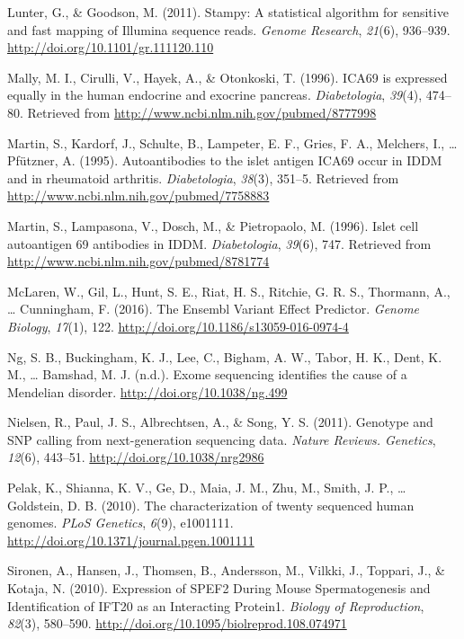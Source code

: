 \documentclass[12pt,twoside]{reedthesis}
\theoremstyle{definition}
\theoremstyle{definition}
\theoremstyle{remark}
\begin{document}
  \hypertarget{ref-Lunter2011}{}
  Lunter, G., \& Goodson, M. (2011). Stampy: A statistical algorithm for
  sensitive and fast mapping of Illumina sequence reads. \emph{Genome
  Research}, \emph{21}(6), 936--939.
  \url{http://doi.org/10.1101/gr.111120.110}
  
  \hypertarget{ref-Mally1996}{}
  Mally, M. I., Cirulli, V., Hayek, A., \& Otonkoski, T. (1996). ICA69 is
  expressed equally in the human endocrine and exocrine pancreas.
  \emph{Diabetologia}, \emph{39}(4), 474--80. Retrieved from
  \url{http://www.ncbi.nlm.nih.gov/pubmed/8777998}
  
  \hypertarget{ref-Martin1995}{}
  Martin, S., Kardorf, J., Schulte, B., Lampeter, E. F., Gries, F. A.,
  Melchers, I., \ldots{} Pfützner, A. (1995). Autoantibodies to the islet
  antigen ICA69 occur in IDDM and in rheumatoid arthritis.
  \emph{Diabetologia}, \emph{38}(3), 351--5. Retrieved from
  \url{http://www.ncbi.nlm.nih.gov/pubmed/7758883}
  
  \hypertarget{ref-Martin1996}{}
  Martin, S., Lampasona, V., Dosch, M., \& Pietropaolo, M. (1996). Islet
  cell autoantigen 69 antibodies in IDDM. \emph{Diabetologia},
  \emph{39}(6), 747. Retrieved from
  \url{http://www.ncbi.nlm.nih.gov/pubmed/8781774}
  
  \hypertarget{ref-McLaren2016}{}
  McLaren, W., Gil, L., Hunt, S. E., Riat, H. S., Ritchie, G. R. S.,
  Thormann, A., \ldots{} Cunningham, F. (2016). The Ensembl Variant Effect
  Predictor. \emph{Genome Biology}, \emph{17}(1), 122.
  \url{http://doi.org/10.1186/s13059-016-0974-4}
  
  \hypertarget{ref-Ng}{}
  Ng, S. B., Buckingham, K. J., Lee, C., Bigham, A. W., Tabor, H. K.,
  Dent, K. M., \ldots{} Bamshad, M. J. (n.d.). Exome sequencing identifies
  the cause of a Mendelian disorder. \url{http://doi.org/10.1038/ng.499}
  
  \hypertarget{ref-Nielsen2011}{}
  Nielsen, R., Paul, J. S., Albrechtsen, A., \& Song, Y. S. (2011).
  Genotype and SNP calling from next-generation sequencing data.
  \emph{Nature Reviews. Genetics}, \emph{12}(6), 443--51.
  \url{http://doi.org/10.1038/nrg2986}
  
  \hypertarget{ref-Pelak2010}{}
  Pelak, K., Shianna, K. V., Ge, D., Maia, J. M., Zhu, M., Smith, J. P.,
  \ldots{} Goldstein, D. B. (2010). The characterization of twenty
  sequenced human genomes. \emph{PLoS Genetics}, \emph{6}(9), e1001111.
  \url{http://doi.org/10.1371/journal.pgen.1001111}
  
  \hypertarget{ref-Sironen2010}{}
  Sironen, A., Hansen, J., Thomsen, B., Andersson, M., Vilkki, J.,
  Toppari, J., \& Kotaja, N. (2010). Expression of SPEF2 During Mouse
  Spermatogenesis and Identification of IFT20 as an Interacting Protein1.
  \emph{Biology of Reproduction}, \emph{82}(3), 580--590.
  \url{http://doi.org/10.1095/biolreprod.108.074971}
  
\end{document}

